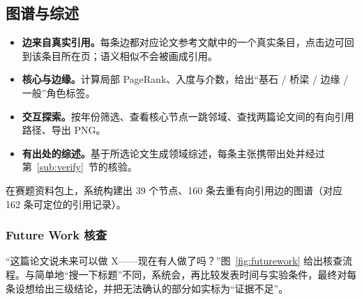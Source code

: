 \subsection{图谱与综述}

\noindent
\begin{minipage}[t]{0.52\linewidth}\vspace{0pt}
  \label{fig:ui-graph}
\end{minipage}\hfill
\begin{minipage}[t]{0.455\linewidth}\vspace{0pt}
\begin{itemize}[leftmargin=1.2em,itemsep=0pt,topsep=0pt]\small
  \item \textbf{边来自真实引用。}每条边都对应论文参考文献中的一个真实条目，点击边可回到该条目所在页；语义相似不会被画成引用。
  \item \textbf{核心与边缘。}计算局部 PageRank、入度与介数，给出“基石 / 桥梁 / 边缘 / 一般”角色标签。
  \item \textbf{交互探索。}按年份筛选、查看核心节点一跳邻域、查找两篇论文间的有向引用路径、导出 PNG。
  \item \textbf{有出处的综述。}基于所选论文生成领域综述，每条主张携带出处并经过第~\ref{sub:verify}~节的核验。
\end{itemize}
\end{minipage}

\vspace{6pt}
在赛题资料包上，系统构建出 39 个节点、160 条去重有向引用边的图谱（对应 162 条可定位的引用记录）。

\subsubsection{Future Work 核查}

“这篇论文说未来可以做 X——现在有人做了吗？”图~\ref{fig:futurework} 给出核查流程。与简单地“搜一下标题”不同，系统会，再比较发表时间与实验条件，最终对每条设想给出三级结论，并把无法确认的部分如实标为“证据不足”。

